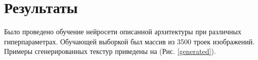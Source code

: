 \documentclass[a4paper]{article}
\begin{document}
	\section{Результаты}
		Было проведено обучение нейросети описанной архитектуры при различных гиперпараметрах. Обучающей выборкой был массив из 3500 троек изображений. Примеры сгенерированных текстур приведены на (Рис. \ref{generated}).
		\begin{figure}
			\begin{minipage}{0.3\linewidth}
			\end{minipage}
			\hfill
			\begin{minipage}{0.3\linewidth}

\end{minipage}
\end{figure}
\end{document}
